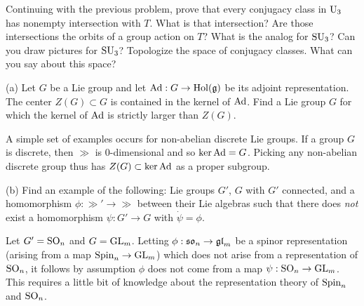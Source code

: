 \documentclass{lkx_pset}
\begin{document}
\begin{problem}{5}
Continuing with the previous problem, prove that every conjugacy class in $\operatorname{U}_3$ has nonempty intersection with $T$. What is that intersection? Are those intersections the orbits of a group action on $T$? What is the analog for $\operatorname{SU}_3$? Can you draw pictures for $\operatorname{SU}_3$? Topologize the space of conjugacy classes. What can you say about this space?
\end{problem}
\begin{solution}
\end{solution}

\begin{problem}{6}
\end{problem}
\begin{parts}
	\begin{part}{(a)}
		Let $G$ be a Lie group and let $\operatorname{Ad} : G \to \operatorname{Hol}(\mathfrak{g})$ be its adjoint representation. The center $Z(G)\subset G$ is contained in the kernel of $\operatorname{Ad}$. Find a Lie group $G$ for which the kernel of $\operatorname{Ad}$ is strictly larger than $Z(G)$.
	\end{part}

	A simple set of examples occurs for non-abelian discrete Lie groups. If a group $G$ is discrete, then $\gg$ is $0$-dimensional and so $\ker \operatorname{Ad} = G$. Picking any non-abelian discrete group thus has $Z(G)\subset \ker \operatorname{Ad}$ as a proper subgroup.

	\begin{part}{(b)}
		Find an example of the following: Lie groups $G'$, $G$ with $G'$ connected, and a homomorphism $\phi : \gg' \to \gg$ between their Lie algebras such that there does \emph{not} exist a homomorphism $\psi : G' \to G$ with $\dot{\psi} = \phi$.
	\end{part}

	Let $G' = \operatorname{SO}_n$ and $G=\operatorname{GL}_m$. Letting $\phi : \mathfrak{so}_n \to \mathfrak{gl}_m$ be a spinor representation (arising from a map $\operatorname{Spin}_n \to \operatorname{GL}_m$) which does not arise from a representation of $\operatorname{SO}_n$, it follows by assumption $\phi$ does not come from a map $\psi : \operatorname{SO}_n \to \operatorname{GL}_m$. This requires a little bit of knowledge about the representation theory of $\operatorname{Spin}_n$ and $\operatorname{SO}_n$.
\end{parts}
\end{document}
